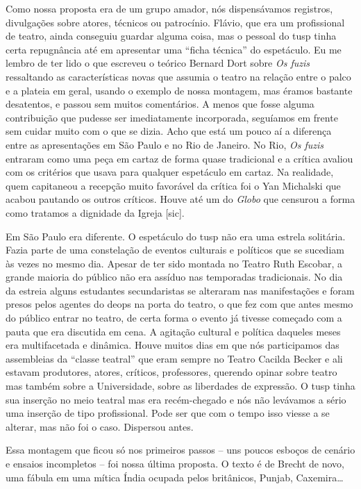 Como nossa proposta era de um grupo amador, nós dispensávamos registros,
divulgações sobre atores, técnicos ou patrocínio. Flávio, que era um
profissional de teatro, ainda conseguiu guardar alguma coisa, mas o
pessoal do {\sc tusp} tinha certa repugnância até em apresentar uma “ficha
técnica” do espetáculo. Eu me lembro de ter lido o que escreveu o
teórico Bernard Dort sobre {\it Os fuzis} ressaltando as características
novas que assumia o teatro na relação entre o palco e a plateia em
geral, usando o exemplo de nossa montagem, mas éramos bastante
desatentos, e passou sem muitos comentários. A menos que fosse alguma
contribuição que pudesse ser imediatamente incorporada, seguíamos em
frente sem cuidar muito com o que se dizia. Acho que está um pouco aí a
diferença entre as apresentações em São Paulo e no Rio de Janeiro. No
Rio, {\it Os fuzis} entraram como uma peça em cartaz de forma quase
tradicional e a crítica avaliou com os critérios que usava para qualquer
espetáculo em cartaz. Na realidade, quem capitaneou a recepção muito
favorável da crítica foi o Yan Michalski que acabou pautando os outros
críticos. Houve até um do {\it Globo} que censurou a forma como tratamos
a dignidade da Igreja {[}sic{]}.

Em São Paulo era diferente. O espetáculo do {\sc tusp} não era uma estrela
solitária. Fazia parte de uma constelação de eventos culturais e
políticos que se sucediam às vezes no mesmo dia. Apesar de ter sido
montada no Teatro Ruth Escobar, a grande maioria do público não era
assíduo nas temporadas tradicionais. No dia da estreia alguns estudantes
secundaristas se alteraram nas manifestações e foram presos pelos
agentes do {\sc deops} na porta do teatro, o que fez com que antes mesmo do
público entrar no teatro, de certa forma o evento já tivesse começado
com a pauta que era discutida em cena. A agitação cultural e política
daqueles meses era multifacetada e dinâmica. Houve muitos dias em que
nós participamos das assembleias da “classe teatral” que eram sempre no
Teatro Cacilda Becker e ali estavam produtores, atores, críticos,
professores, querendo opinar sobre teatro mas também sobre a
Universidade, sobre as liberdades de expressão. O {\sc tusp} tinha sua
inserção no meio teatral mas era recém-chegado e nós não levávamos a
sério uma inserção de tipo profissional. Pode ser que com o tempo isso
viesse a se alterar, mas não foi o caso. Dispersou antes.

\subject{A montagem truncada de “Mann ist Mann”}

Essa montagem que ficou só nos primeiros passos -- uns poucos esboços de
cenário e ensaios incompletos -- foi nossa última proposta. O texto é de
Brecht de novo, uma fábula em uma mítica Índia ocupada pelos britânicos,
Punjab, Caxemira\ldots{}

